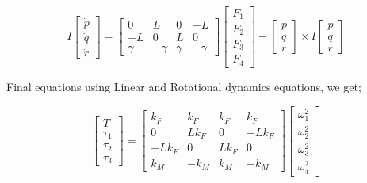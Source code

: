 \[
I\begin{bmatrix}
    \dot{p} \\
    \dot{q} \\
    \dot{r}
\end{bmatrix} = 
\begin{bmatrix}
    0 & L & 0 & -L \\
    -L & 0 & L & 0 \\
    \gamma & -\gamma & \gamma & -\gamma
\end{bmatrix}
\begin{bmatrix}
    F_1 \\
    F_2 \\
    F_3 \\
    F_4
\end{bmatrix}- 
\begin{bmatrix}
    p \\
    q \\
    r
\end{bmatrix}
\times I\begin{bmatrix}
    p \\
    q \\
    r
\end{bmatrix}
\]

Final equations using Linear and Rotational dynamics equations, we get;

\[
\begin{bmatrix}
    T \\
    \tau_1 \\
    \tau_2 \\
    \tau_3
\end{bmatrix} = 
\begin{bmatrix}
    k_F & k_F & k_F & k_F \\
    0 & Lk_F & 0 & -Lk_F \\
    -Lk_F & 0 & Lk_F & 0 \\
    k_M & -k_M & k_M & -k_M
\end{bmatrix}
\begin{bmatrix}
    \omega_1^2 \\
    \omega_2^2 \\
    \omega_3^2 \\
    \omega_4^2
\end{bmatrix}
\]



